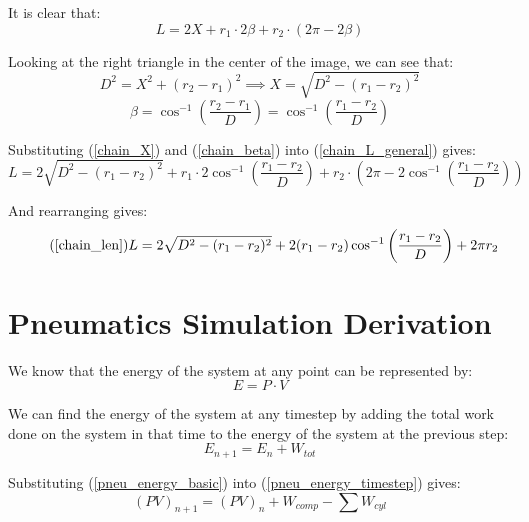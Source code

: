 \documentclass[11pt,a4paper,titlepage]{article}
\begin{document}
	It is clear that:
	\begin{equation} \label{chain_L_general}
		L = 2 X + r_1 \cdot 2 \beta + r_2 \cdot (2 \pi - 2 \beta)
	\end{equation}
	
	Looking at the right triangle in the center of the image, we can see that:
	\begin{equation} \label{chain_X}
		D^2 = X^2 + (r_2 - r_1)^2 \implies X = \sqrt{D^2 - (r_1 - r_2)^2}
	\end{equation}
	\begin{equation} \label{chain_beta}
		\beta = \cos^{-1} \left( \frac{r_2 - r_1}{D} \right) = \cos^{-1} \left( \frac{r_1 - r_2}{D} \right)
	\end{equation}
	
	Substituting (\ref{chain_X}) and (\ref{chain_beta}) into (\ref{chain_L_general}) gives:
	\begin{equation}
		L = 2 \sqrt{D^2 - (r_1 - r_2)^2} + r_1 \cdot 2 \cos^{-1} \left( \frac{r_1 - r_2}{D} \right) + r_2 \cdot \left( 2 \pi - 2 \cos^{-1} \left( \frac{r_1 - r_2}{D} \right) \right)
	\end{equation}
	
	And rearranging gives:
	\begin{equation} \tag{\ref*{chain_len}}
		L = 2 \sqrt{D^2 - (r_1 - r_2)^2} + 2 (r_1 - r_2) \cos^{-1} \left( \frac{r_1 - r_2}{D} \right) + 2 \pi r_2
	\end{equation}
	
	\newpage
	\section{Pneumatics Simulation Derivation} \label{pneu_appendix}
	We know that the energy of the system at any point can be represented by:
	\begin{equation} \label{pneu_energy_basic}
		E = P \cdot V
	\end{equation}
	
	We can find the energy of the system at any timestep by adding the total work done on the system in that time to the energy of the system at the previous step:
	\begin{equation} \label{pneu_energy_timestep}
		E_{n+1} = E_n + W_{tot}
	\end{equation}
	
	Substituting (\ref{pneu_energy_basic}) into (\ref{pneu_energy_timestep}) gives:
	\begin{equation}
		(PV)_{n+1} = (PV)_n + W_{comp} - \sum W_{cyl}
	\end{equation}
	
\end{document}
